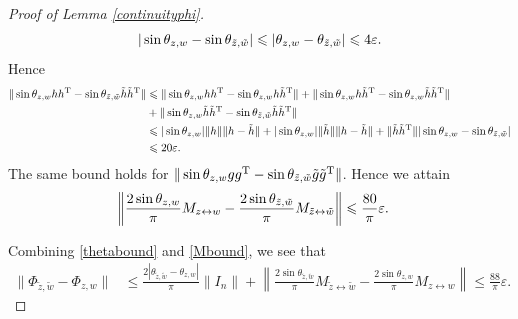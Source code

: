 \documentclass[11pt]{article}
\renewcommand{\epsilon}{\varepsilon}
\renewcommand{\top}{{\mathrm{T}}}
\theoremstyle{remark}
\begin{document}
\begin{proof}[Proof of Lemma \ref{continuityphi}]
\begin{align*}
    |\sin\theta_{z,w} - \sin\theta_{\Tilde{z},\Tilde{w}}| \leqslant |\theta_{z,w} - \theta_{\Tilde{z},\Tilde{w}}| \leqslant 4\epsilon.
\end{align*} Hence \begin{align*}
    \|\sin \theta_{z, w}hh^\top - \sin \theta_{\tilde{z}, \tilde{w}}\Tilde{h}\Tilde{h}^\top\| & \leqslant \|\sin \theta_{z, w}hh^\top - \sin \theta_{z, w}h\Tilde{h}^\top\| + \|\sin \theta_{z, w}h\tilde{h}^\top - \sin \theta_{z, w}\tilde{h}\Tilde{h}^\top\| \\
    & + \|\sin \theta_{z, w}\tilde{h}\Tilde{h}^\top - \sin \theta_{\tilde{z}, \tilde{w}}\Tilde{h}\Tilde{h}^\top\| \\
    & \leqslant |\sin\theta_{z,w}|\|h\|\|h-\Tilde{h}\| + |\sin\theta_{z,w}|\|\Tilde{h}\|\|h-\Tilde{h}\| + \|\Tilde{h}\Tilde{h}^\top\||\sin\theta_{z,w}-\sin\theta_{\Tilde{z},\Tilde{w}}| \\
    & \leqslant 20\epsilon.
\end{align*} The same bound holds for $\|\sin\theta_{z,w}gg^\top - \sin\theta_{\Tilde{z},\Tilde{w}} \Tilde{g}\Tilde{g}^\top\|$. Hence we attain \begin{align}
    \left\|\frac{2\sin \theta_{z, w}}{\pi}M_{z \leftrightarrow w} -  \frac{2\sin \theta_{\Tilde{z}, \Tilde{w}}}{\pi}M_{\Tilde{z} \leftrightarrow \Tilde{w}}\right\| & \leqslant \frac{80}{\pi} \epsilon \label{Mbound}.
\end{align} 

Combining \eqref{thetabound} and \eqref{Mbound}, we see that \begin{align*}
    \|\Phi_{\tilde{z},\tilde{w}} - \Phi_{z,w}\| & \leqslant \frac{2|\theta_{\tilde{z},\tilde{w}} - \theta_{z,w}|}{\pi}\|I_n\| + \left\| \frac{2\sin \theta_{\tilde{z},\tilde{w}}}{\pi}M_{\tilde{z} \leftrightarrow \tilde{w}} - \frac{2\sin \theta_{z,w}}{\pi}M_{z \leftrightarrow w}\right\| \leqslant \frac{88}{\pi}\epsilon.
\end{align*}                                                                                        

\end{proof}
\end{document}
